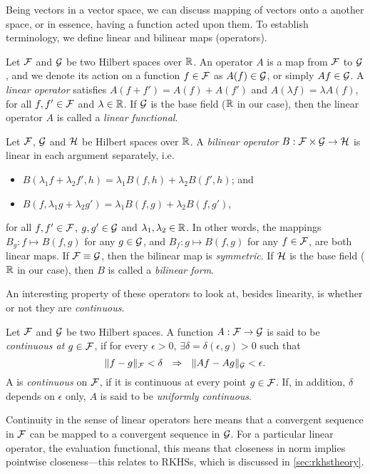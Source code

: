 Being vectors in a vector space, we can discuss mapping of vectors onto a another space, or in essence, having a function acted upon them.
To establish terminology, we define linear and bilinear maps (operators).
%
\begin{definition}
  Let ${\mathcal F}$ and ${\mathcal G}$ be two Hilbert spaces over $\mathbb{R}$.
  An operator $A$ is a map from ${\mathcal F}$ to ${\mathcal G}$, and we denote its action on a function $f \in{\mathcal F}$ as $A(f) \in {\mathcal G}$, or simply $Af \in {\mathcal G}$.
  A \emph{linear operator} satisfies $A(f+f') = A(f) + A(f')$ and $A(\lambda f) = \lambda A(f)$, for all $f,f' \in{\mathcal F}$ and $\lambda\in\mathbb{R}$.
  If ${\mathcal G}$ is the base field ($\mathbb{R}$ in our case), then the linear operator $A$ is called a \emph{linear functional}.
\end{definition}
%
\begin{definition}
  Let ${\mathcal F}$, ${\mathcal G}$ and ${\mathcal H}$ be Hilbert spaces over $\mathbb{R}$.
  A \emph{bilinear operator} $B:{\mathcal F}\times{\mathcal G}\to{\mathcal H}$ is linear in each argument separately, i.e.
  \begin{itemize}
    \item $B(\lambda_1 f +\lambda_2 f', h) = \lambda_1 B(f,h) + \lambda_2 B(f',h)$; and
    \item $B(f, \lambda_1 g +\lambda_2 g') = \lambda_1 B(f,g) + \lambda_2 B(f,g')$,
  \end{itemize} 
  for all $f,f' \in {\mathcal F}$, $g,g' \in {\mathcal G}$ and $\lambda_1,\lambda_2\in\mathbb{R}$.
  In other words, the mappings $B_g: f \mapsto B(f,g)$ for any $g\in{\mathcal G}$, and $B_f: g \mapsto B(f,g)$ for any $f\in{\mathcal F}$, are both linear maps.
  If ${\mathcal F}\equiv{\mathcal G}$, then the bilinear map is \emph{symmetric}.
  If ${\mathcal H}$ is the base field ($\mathbb{R}$ in our case), then $B$ is called a \emph{bilinear form}.
\end{definition}
%
An interesting property of these operators to look at, besides linearity, is whether or not they are \emph{continuous}.
%
\begin{definition}[Continuity]\label{def:continuity}
  Let ${\mathcal F}$ and ${\mathcal G}$ be two Hilbert spaces.
  A function $A:{\mathcal F}\to{\mathcal G}$ is said to be \emph{continuous at $g\in{\mathcal F}$}, if for every $\epsilon>0$, $\exists \delta=\delta(\epsilon,g)>0$ such that
  \[
    \norm{f-g}_\cF < \delta \ \ \Rightarrow \ \ \norm{Af - Ag}_\cG < \epsilon.
  \]
  A is \emph{continuous} on ${\mathcal F}$, if it is continuous at every point $g \in{\mathcal F}$.
  If, in addition, $\delta$ depends on $\epsilon$ only, $A$ is said to be \emph{uniformly continuous}.
\end{definition}
%
Continuity in the sense of linear operators here means that a convergent sequence in ${\mathcal F}$ can be mapped to a convergent sequence in ${\mathcal G}$.
For a particular linear operator, the evaluation functional, this means that closeness in norm implies pointwise closeness---this relates to RKHSs, which is discussed in \cref{sec:rkhstheory}.


